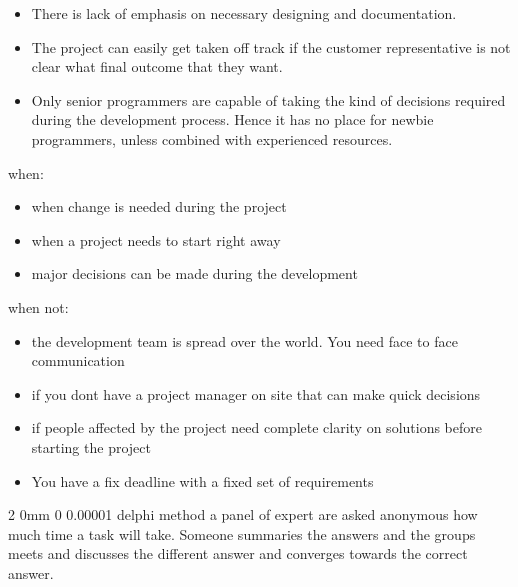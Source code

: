 \documentclass[a4paper,11pt]{article}
\makeatletter
\renewcommand{\subsection}{\@startsection
   {subsection}%
   {2}%
   {0mm}%
   {0\baselineskip}%
   {0.00001\baselineskip}%
   {\rmfamily\normalfont\slshape\normalsize}}%
\makeatother
\begin{document}
\begin{multicols}{2}
\begin{itemize}
\item There is lack of emphasis on necessary designing and documentation.
\item The project can easily get taken off track if the customer representative is not clear what final outcome that they want.
\item Only senior programmers are capable of taking the kind of decisions required during the development process. Hence it has no place for newbie programmers, unless combined with experienced resources.
\end{itemize}
when:
\vspace{0 mm}
\begin{itemize}
 \setlength\itemsep{0em}
\item when change is needed during the project
\item when a project needs to start right away
\item major decisions can be made during the development
\end{itemize}
when not:
\vspace{0 mm}
\begin{itemize}
 \setlength\itemsep{0em}
\item the development team is spread over the world. You need face to face communication
\item if you dont have a project manager on site that can make quick decisions
\item if people affected by the project need complete clarity on solutions before starting the project
\item You have a fix deadline with a fixed set of requirements
\end{itemize}

\subsection{delphi method}
a panel of expert are asked anonymous how much time a task will take. Someone summaries the answers and the groups meets and discusses the different answer and converges towards the correct answer.


\end{multicols}
\end{document}
